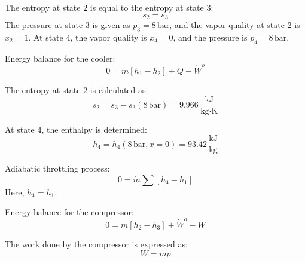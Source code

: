 The entropy at state \( 2 \) is equal to the entropy at state \( 3 \):  
\[
s_2 = s_3
\]  
The pressure at state \( 3 \) is given as \( p_3 = 8 \, \text{bar} \), and the vapor quality at state \( 2 \) is \( x_2 = 1 \). At state \( 4 \), the vapor quality is \( x_4 = 0 \), and the pressure is \( p_4 = 8 \, \text{bar} \).  

Energy balance for the cooler:  
\[
0 = \dot{m} \left[ h_1 - h_2 \right] + Q - \dot{W}^o
\]  

The entropy at state \( 2 \) is calculated as:  
\[
s_2 = s_3 - s_3(8 \, \text{bar}) = 9.966 \, \frac{\text{kJ}}{\text{kg·K}}
\]  

At state \( 4 \), the enthalpy is determined:  
\[
h_4 = h_4(8 \, \text{bar}, x = 0) = 93.42 \, \frac{\text{kJ}}{\text{kg}}
\]  

Adiabatic throttling process:  
\[
0 = \dot{m} \sum \left[ h_4 - h_1 \right]
\]  
Here, \( h_4 = h_1 \).  

Energy balance for the compressor:  
\[
0 = \dot{m} \left[ h_2 - h_3 \right] + \dot{W}^o - W
\]  

The work done by the compressor is expressed as:  
\[
W = m \dot{p}
\]